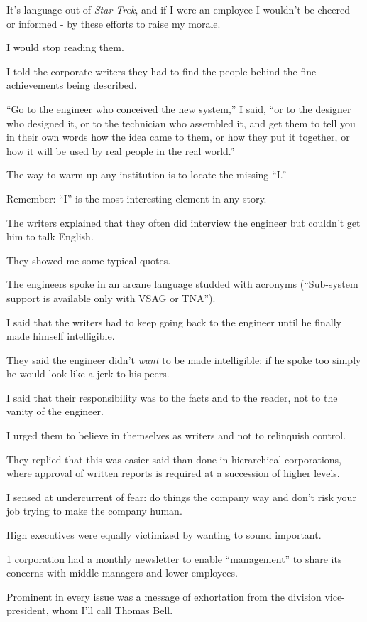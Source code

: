 \documentclass{book}
\numberwithin{equation}{section}
\begin{document}
It's language out of \textit{Star Trek}, and if I were an employee I wouldn't be cheered - or informed - by these efforts to raise my morale.

I would stop reading them.

I told the corporate writers they had to find the people behind the fine achievements being described.

``Go to the engineer who conceived the new system,'' I said, ``or to the designer who designed it, or to the technician who assembled it, and get them to tell you in their own words how the idea came to them, or how they put it together, or how it will be used by real people in the real world.''

The way to warm up any institution is to locate the missing ``I.''

Remember: ``I'' is the most interesting element in any story.

The writers explained that they often did interview the engineer but couldn't get him to talk English.

They showed me some typical quotes.

The engineers spoke in an arcane language studded with acronyms (``Sub-system support is available only with VSAG or TNA'').

I said that the writers had to keep going back to the engineer until he finally made himself intelligible.

They said the engineer didn't \textit{want} to be made intelligible: if he spoke too simply he would look like a jerk to his peers.

I said that their responsibility was to the facts and to the reader, not to the vanity of the engineer.

I urged them to believe in themselves as writers and not to relinquish control.

They replied that this was easier said than done in hierarchical corporations, where approval of written reports is required at a succession of higher levels.

I sensed at undercurrent of fear: do things the company way and don't risk your job trying to make the company human.

High executives were equally victimized by wanting to sound important.

1 corporation had a monthly newsletter to enable ``management'' to share its concerns with middle managers and lower employees.

Prominent in every issue was a message of exhortation from the division vice-president, whom I'll call Thomas Bell.
\end{document}
